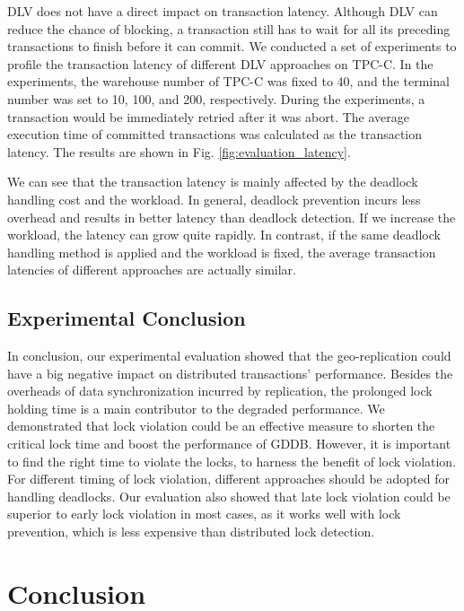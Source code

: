 \documentclass[conference]{IEEEtran}
\begin{document}
\begin{highlighted}
  DLV does not have a direct impact on transaction latency.
  Although DLV can reduce the chance of blocking, a transaction still has to wait for all its preceding transactions to finish before it can commit.
  We conducted a set of experiments to profile the transaction latency of different DLV approaches on TPC-C. 
  In the experiments, the warehouse number of TPC-C was fixed to 40, and the terminal number was set to 10, 100, and 200, respectively.
  During the experiments, a transaction would be immediately retried after it was abort.
  The average execution time of committed transactions was calculated as the transaction latency. The results are shown in Fig. \ref{fig:evaluation_latency}.
  
  We can see that the transaction latency is mainly affected by the deadlock handling cost and the workload.
  In general, deadlock prevention incurs less overhead and results in better latency than deadlock detection. If we increase the workload, the latency can grow quite rapidly.
  In contrast, if the same deadlock handling method is applied and the workload is fixed, the average transaction latencies of different approaches are actually similar. 

\end{highlighted}
\subsection{Experimental Conclusion}

In conclusion, our experimental evaluation showed that the geo-replication could have a big negative impact on distributed transactions' performance.
Besides the overheads of data synchronization incurred by replication, the prolonged lock holding time is a main contributor to the degraded performance.
We demonstrated that lock violation could be an effective measure to shorten the critical lock time and boost the performance of GDDB.
However, it is important to find the right time to violate the locks, to harness the benefit of lock violation.
For different timing of lock violation, different approaches should be adopted for handling deadlocks.
Our evaluation also showed that late lock violation could be superior to early lock violation in most cases, as it works well with lock prevention, which is less expensive than distributed lock detection.


\section{Conclusion}
\label{sec:conclusion}
\end{document}
